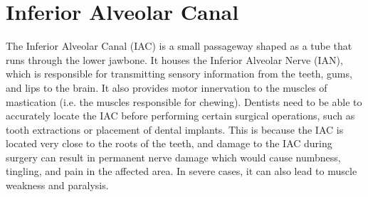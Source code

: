 \section{Inferior Alveolar Canal}
The Inferior Alveolar Canal (IAC) is a small passageway shaped as a tube that
runs through the lower jawbone. It houses the Inferior Alveolar Nerve (IAN),
which is responsible for transmitting sensory information from the teeth, gums,
and lips to the brain. It also provides motor innervation to the muscles of
mastication (i.e. the muscles responsible for chewing). Dentists need to be able
to accurately locate the IAC before performing certain surgical operations, such
as tooth extractions or placement of dental implants. This is because the IAC is
located very close to the roots of the teeth, and damage to the IAC during
surgery can result in permanent nerve damage which would cause numbness,
tingling, and pain in the affected area. In severe cases, it can also lead to
muscle weakness and paralysis.

